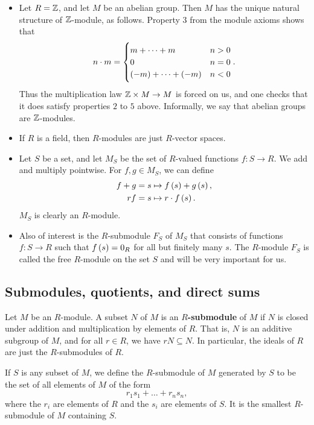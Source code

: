 \begin{example*}
\begin{itemize}
\item Let $ R = \mathbb{Z} $, and let $ M $ be an abelian group. Then $ M $ has the unique natural structure of $ \mathbb{Z} $-module, as follows. Property $ 3 $ from the module axioms shows that
$$ n \cdot m =
\begin{cases}
m + \dots + m & n > 0 \\
0 & n = 0 \\
\br{-m} + \dots + \br{-m} & n < 0
\end{cases}.
$$
Thus the multiplication law $ \mathbb{Z} \times M \to M $ is forced on us, and one checks that it does satisfy properties $ 2 $ to $ 5 $ above. Informally, we say that abelian groups are $ \mathbb{Z} $-modules.
\item If $ R $ is a field, then $ R $-modules are just $ R $-vector spaces.
\item Let $ S $ be a set, and let $ M_S $ be the set of $ R $-valued functions $ f : S \to R $. We add and multiply pointwise. For $ f, g \in M_S $, we can define
\begin{align*}
f + g & = s \mapsto f\br{s} + g\br{s}, \\
rf & = s \mapsto r \cdot f\br{s}.
\end{align*}
$ M_S $ is clearly an $ R $-module.
\item Also of interest is the $ R $-submodule $ F_S $ of $ M_S $ that consists of functions $ f : S \to R $ such that $ f\br{s} = 0_R $ for all but finitely many $ s $. The $ R $-module $ F_S $ is called the free $ R $-module on the set $ S $ and will be very important for us.
\end{itemize}
\end{example*}

\subsection{Submodules, quotients, and direct sums}

\begin{definition}
Let $ M $ be an $ R $-module. A subset $ N $ of $ M $ is an \textbf{$ R $-submodule} of $ M $ if $ N $ is closed under addition and multiplication by elements of $ R $. That is, $ N $ is an additive subgroup of $ M $, and for all $ r \in R $, we have $ rN \subseteq N $. In particular, the ideals of $ R $ are just the $ R $-submodules of $ R $.
\end{definition}

\begin{definition}
If $ S $ is any subset of $ M $, we define the $ R $-submodule of $ M $ generated by $ S $ to be the set of all elements of $ M $ of the form
$$ r_1s_1 + \dots + r_ns_n, $$
where the $ r_i $ are elements of $ R $ and the $ s_i $ are elements of $ S $. It is the smallest $ R $-submodule of $ M $ containing $ S $.
\end{definition}

